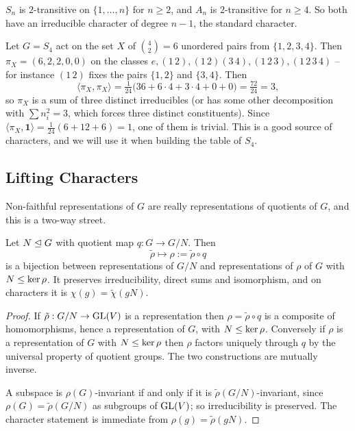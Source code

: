 \documentclass[a4paper]{scrartcl}
\newcommand{\ip}[2]{\langle #1, #2 \rangle}
\begin{document}
\begin{example}[$S_n$ and $A_n$]
	$S_n$ is $2$-transitive on $\{1,\dots,n\}$ for $n \geq 2$, and $A_n$ is $2$-transitive for $n \geq 4$. So both have an irreducible character of degree $n-1$, the standard character.
\end{example}

\begin{example}
	Let $G = S_4$ act on the set $X$ of $\binom42 = 6$ unordered pairs from $\{1,2,3,4\}$. Then $\pi_X = (6, 2, 2, 0, 0)$ on the classes $e, (1\,2), (1\,2)(3\,4), (1\,2\,3), (1\,2\,3\,4)$ -- for instance $(1\,2)$ fixes the pairs $\{1,2\}$ and $\{3,4\}$. Then
	$$\ip{\pi_X}{\pi_X} = \tfrac1{24}\big(36 + 6\cdot 4 + 3\cdot 4 + 0 + 0\big) = \tfrac{72}{24} = 3,$$
	so $\pi_X$ is a sum of three distinct irreducibles (or has some other decomposition with $\sum n_i^2 = 3$, which forces three distinct constituents). Since $\ip{\pi_X}{\mathbf 1} = \frac1{24}(6 + 12 + 6) = 1$, one of them is trivial. This is a good source of characters, and we will use it when building the table of $S_4$.
\end{example}

\subsection{Lifting Characters}

Non-faithful representations of $G$ are really representations of quotients of $G$, and this is a two-way street.

\begin{proposition}[Lifting]
	Let $N \trianglelefteq G$ with quotient map $q : G \to G/N$. Then
	$$\tilde\rho \longmapsto \rho := \tilde\rho \circ q$$
	is a bijection between representations of $G/N$ and representations of $\rho$ of $G$ with $N \leq \operatorname{ker}\rho$. It preserves irreducibility, direct sums and isomorphism, and on characters it is $\chi(g) = \tilde\chi(gN)$.
\end{proposition}
\begin{proof}
	If $\tilde\rho : G/N \to \operatorname{GL}(V)$ is a representation then $\rho = \tilde\rho\circ q$ is a composite of homomorphisms, hence a representation of $G$, with $N \leq \operatorname{ker} \rho$. Conversely if $\rho$ is a representation of $G$ with $N \leq \operatorname{ker}\rho$ then $\rho$ factors uniquely through $q$ by the universal property of quotient groups. The two constructions are mutually inverse.

	A subspace is $\rho(G)$-invariant if and only if it is $\tilde\rho(G/N)$-invariant, since $\rho(G) = \tilde\rho(G/N)$ as subgroups of $\operatorname{GL}(V)$; so irreducibility is preserved. The character statement is immediate from $\rho(g) = \tilde\rho(gN)$.
\end{proof}
\end{document}
